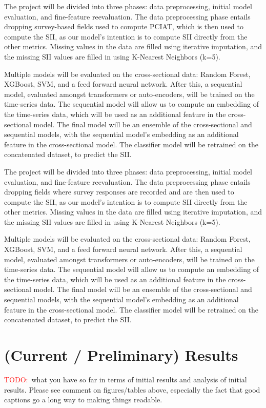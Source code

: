 \documentclass[11pt]{extarticle}
\newcommand{\todo}{\textcolor{red}{TODO:}~}
\begin{document}
The project will be divided into three phases: data preprocessing, initial model evaluation, and fine-feature reevaluation.
The data preprocessing phase entails dropping survey-based fields used to compute PCIAT, which is then used to compute the SII, as our model's intention is to compute SII directly from the other metrics.
Missing values in the data are filled using iterative imputation, and the missing SII values are filled in using K-Nearest Neighbors (k=5).

Multiple models will be evaluated on the cross-sectional data: Random Forest, XGBoost, SVM, and a feed forward neural network. After this, a sequential model, evaluated amongst transformers or auto-encoders, will be trained on the time-series data. The sequential model will allow us to compute an embedding of the time-series data, which will be used as an additional feature in the cross-sectional model.
The final model will be an ensemble of the cross-sectional and sequential models, with the sequential model's embedding as an additional feature in the cross-sectional model. The classifier model will be retrained on the concatenated dataset, to predict the SII.

The project will be divided into three phases: data preprocessing, initial model evaluation, and fine-feature reevaluation.
The data preprocessing phase entails dropping fields where survey responses are recorded and are then used to compute the SII, as our model's intention is to compute SII directly from the other metrics.
Missing values in the data are filled using iterative imputation, and the missing SII values are filled in using K-Nearest Neighbors (k=5).

Multiple models will be evaluated on the cross-sectional data: Random Forest, XGBoost, SVM, and a feed forward neural network. After this, a sequential model, evaluated amongst transformers or auto-encoders, will be trained on the time-series data. The sequential model will allow us to compute an embedding of the time-series data, which will be used as an additional feature in the cross-sectional model.
The final model will be an ensemble of the cross-sectional and sequential models, with the sequential model's embedding as an additional feature in the cross-sectional model. The classifier model will be retrained on the concatenated dataset, to predict the SII.

\section{(Current / Preliminary) Results} 
\todo what you have so far in terms of initial results and analysis of initial results. Please see comment on figures/tables above, especially the fact that good captions go a long way to making things readable.
\end{document}
